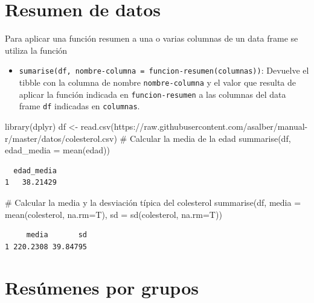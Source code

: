 \documentclass[
  a4paper,
]{scrreport}
\newenvironment{Shaded}{\begin{snugshade}}{\end{snugshade}}
\newcommand{\AttributeTok}[1]{\textcolor[rgb]{0.40,0.45,0.13}{#1}}
\newcommand{\CommentTok}[1]{\textcolor[rgb]{0.37,0.37,0.37}{#1}}
\newcommand{\FunctionTok}[1]{\textcolor[rgb]{0.28,0.35,0.67}{#1}}
\newcommand{\NormalTok}[1]{\textcolor[rgb]{0.00,0.23,0.31}{#1}}
\newcommand{\OtherTok}[1]{\textcolor[rgb]{0.00,0.23,0.31}{#1}}
\newcommand{\StringTok}[1]{\textcolor[rgb]{0.13,0.47,0.30}{#1}}
\providecommand{\tightlist}{%
  \setlength{\itemsep}{0pt}\setlength{\parskip}{0pt}}\usepackage{longtable,booktabs,array}
\theoremstyle{definition}
\theoremstyle{definition}
\theoremstyle{remark}
\begin{document}
\hypertarget{resumen-de-datos}{%
\section{Resumen de datos}\label{resumen-de-datos}}

Para aplicar una función resumen a una o varias columnas de un data
frame se utiliza la función

\begin{itemize}
\tightlist
\item
  \texttt{sumarise(df,\ nombre-columna\ =\ funcion-resumen(columnas))}:
  Devuelve el tibble con la columna de nombre \texttt{nombre-columna} y
  el valor que resulta de aplicar la función indicada en
  \texttt{funcion-resumen} a las columnas del data frame \texttt{df}
  indicadas en \texttt{columnas}.
\end{itemize}

\begin{Shaded}
\begin{Highlighting}[]
\FunctionTok{library}\NormalTok{(dplyr)}
\NormalTok{df }\OtherTok{\textless{}{-}} \FunctionTok{read.csv}\NormalTok{(}\StringTok{\textquotesingle{}https://raw.githubusercontent.com/asalber/manual{-}r/master/datos/colesterol.csv\textquotesingle{}}\NormalTok{)}
\CommentTok{\# Calcular la media de la edad}
\FunctionTok{summarise}\NormalTok{(df, }\AttributeTok{edad\_media =} \FunctionTok{mean}\NormalTok{(edad))}
\end{Highlighting}
\end{Shaded}

\begin{verbatim}
  edad_media
1   38.21429
\end{verbatim}

\begin{Shaded}
\begin{Highlighting}[]
\CommentTok{\# Calcular la media y la desviación típica del colesterol}
\FunctionTok{summarise}\NormalTok{(df, }\AttributeTok{media =} \FunctionTok{mean}\NormalTok{(colesterol, }\AttributeTok{na.rm=}\NormalTok{T), }\AttributeTok{sd =} \FunctionTok{sd}\NormalTok{(colesterol, }\AttributeTok{na.rm=}\NormalTok{T))}
\end{Highlighting}
\end{Shaded}

\begin{verbatim}
     media       sd
1 220.2308 39.84795
\end{verbatim}

\hypertarget{resuxfamenes-por-grupos}{%
\section{Resúmenes por grupos}\label{resuxfamenes-por-grupos}}
\end{document}

